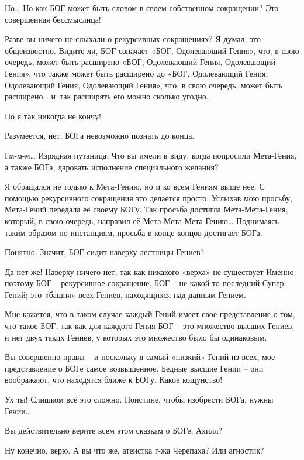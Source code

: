 \documentclass[../main.tex]{subfiles}
\begin{document}
\begin{Dialogue}
\begin{sublevel}
\begin{sublevel}
 Но\ldots{} Но как БОГ может быть словом в своем собственном сокращении? Это совершенная бессмыслица!

 Разве вы ничего не слыхали о рекурсивных сокращениях? Я думал, это общеизвестно. Видите ли, БОГ означает «БОГ, Одолевающий Гения», что, в свою очередь, может быть расширено «БОГ, Одолевающий Гения, Одолевающий Гения», что также может быть расширено до «БОГ, Одолевающий Гения, Одолевающий Гения, Одолевающий Гения», что, в свою очередь, может быть расширено\ldots{} и~так расширять его можно сколько угодно.

 Но я так никогда не кончу!

 Разумеется, нет. БОГа невозможно познать до конца.

 Гм-м-м\ldots{} Изрядная путаница. Что вы имели в виду, когда попросили Мета-Гения, а также БОГа, даровать исполнение специального желания?

 Я обращался не только к Мета-Гению, но и ко всем Гениям выше нее. С помощью рекурсивного сокращения это делается просто. Услыхав мою просьбу, Мета-Гений передала её своему БОГу. Так просьба достигла Мета-Мета-Гения, который, в свою очередь, направил её Мета-Мета-Мета-Гению\ldots{} Поднимаясь таким образом по инстанциям, просьба в конце концов достигает БОГа.

 Понятно. Значит, БОГ сидит наверху лестницы Гениев?

 Да нет же! Наверху ничего нет, так как никакого «верха» не существует Именно поэтому БОГ \--- рекурсивное сокращение. БОГ \--- не какой-то последний Супер-Гений; это «башня» всех Гениев, находящихся над данным Гением.

 Мне кажется, что в таком случае каждый Гений имеет свое представление о том, что такое БОГ, так как для каждого Гения БОГ \--- это множество высших Гениев, и нет двух таких Гениев, у которых это множество было бы одинаковым.

 Вы совершенно правы \--- и поскольку я самый «низкий» Гений из всех, мое представление о БОГе самое возвышенное. Бедные высшие Гении \--- они воображают, что находятся ближе к БОГу. Какое кощунство!

 Ух ты! Слишком всё это сложно. Поистине, чтобы изобрести БОГа, нужны Гении\ldots{}

 Вы действительно верите всем этом сказкам о БОГе, Ахилл?

 Ну конечно, верю. А вы что же, атеистка г-жа Черепаха? Или агностик?


\end{sublevel}
\end{sublevel}
\end{Dialogue}
\end{document}
